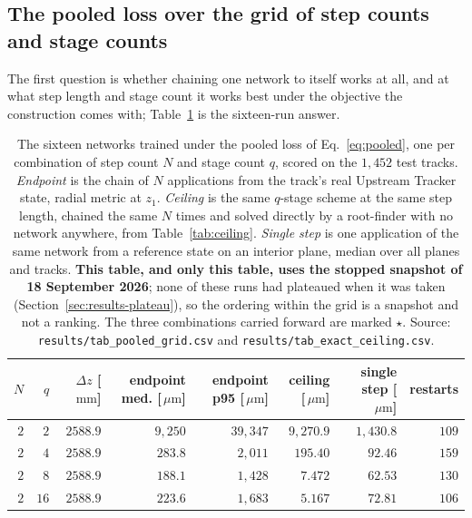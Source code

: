 \documentclass[11pt,a4paper]{article}
\newcommand{\um}{\ensuremath{\,\mu\mathrm{m}}}
\newcommand{\mm}{\ensuremath{\,\mathrm{mm}}}
\begin{document}
\subsection{The pooled loss over the grid of step counts and stage counts}
\label{sec:results-grid}

The first question is whether chaining one network to itself works at all, and
at what step length and stage count it works best under the objective the
construction comes with; Table~\ref{tab:grid} is the sixteen-run answer.

\begin{table}[tbp]
  \centering
  \caption{The sixteen networks trained under the pooled loss of
  Eq.~\eqref{eq:pooled}, one per combination of step count $N$ and stage count
  $q$, scored on the $1{,}452$ test tracks. \emph{Endpoint} is the chain of $N$
  applications from the track's real Upstream Tracker state, radial metric at
  $z_1$. \emph{Ceiling} is the same $q$-stage scheme at the same step length,
  chained the same $N$ times and solved directly by a root-finder with no
  network anywhere, from Table~\ref{tab:ceiling}. \emph{Single step} is one
  application of the same network from a reference state on an interior plane,
  median over all planes and tracks. \textbf{This table, and only this table,
  uses the stopped snapshot of 18 September 2026}; none of these runs had
  plateaued when it was taken (Section~\ref{sec:results-plateau}), so the
  ordering within the grid is a snapshot and not a ranking. The three
  combinations carried forward are marked $\star$. Source:
  \texttt{results/tab\_pooled\_grid.csv} and
  \texttt{results/tab\_exact\_ceiling.csv}.}
  \label{tab:grid}
  \footnotesize
  \setlength{\tabcolsep}{5pt}
  \begin{tabular}{rrrrrrrr}
    \toprule
    $N$ & $q$ & $\Delta z$ [\!\mm] & endpoint med. [\!\um] &
    endpoint p95 [\!\um] & ceiling [\!\um] & single step [\!\um] &
    restarts \\
    \midrule
    $2$   & $2$  & $2588.9$ & $9{,}250$ & $39{,}347$ & $9{,}270.9$   & $1{,}430.8$ & $109$ \\
    $2$   & $4$  & $2588.9$ & $283.8$   & $2{,}011$  & $195.40$      & $92.46$     & $159$ \\
    $2$   & $8$  & $2588.9$ & $188.1$   & $1{,}428$  & $7.472$       & $62.53$     & $130$ \\
    $2$   & $16$ & $2588.9$ & $223.6$   & $1{,}683$  & $5.167$       & $72.81$     & $106$ \\

\end{tabular}
\end{table}
\end{document}
